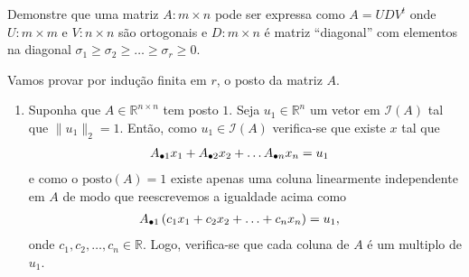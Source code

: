 \begin{questions}

     Demonstre que uma matriz $A : m \times n$ pode ser expressa como $A = U D V^t$ onde $U : m \times m$ e $V : n \times n$ s\~{a}o ortogonais e $D : m \times n$ \'{e} matriz ``diagonal'' com elementos na diagonal $\sigma_1 \geq \sigma_2 \geq \ldots \geq \sigma_r \geq 0$.
    \begin{solution}
        Vamos provar por indu\c{c}\~{a}o finita em $r$, o posto da matriz $A$.
        \begin{enumerate}
            \item Suponha que $A \in \mathbb{R}^{n \times n}$ tem posto $1$. Seja $u_1 \in \mathbb{R}^n$ um vetor em $\mathcal{I}(A)$ tal que $\| u_1 \|_2 = 1$. Ent\~{a}o, como $u_1 \in \mathcal{I}(A)$ verifica-se que existe $x$ tal que
                \begin{align*}
                    A_{\bullet 1} x_1 + A_{\bullet 2} x_2 + \ldots A_{\bullet n} x_n &= u_1
                \end{align*}
                e como o $\mathrm{posto}(A) = 1$ existe apenas uma coluna linearmente independente em $A$ de modo que reescrevemos a igualdade acima como
                \begin{align*}
                    A_{\bullet 1} \left( c_1 x_1 + c_2 x_2 + \ldots + c_n x_n \right) &= u_1,
                \end{align*}
                onde $c_1, c_2, \ldots, c_n \in \mathbb{R}$. Logo, verifica-se que cada coluna de $A$ \'{e} um multiplo de $u_1$.


\end{enumerate}
\end{solution}
\end{questions}
